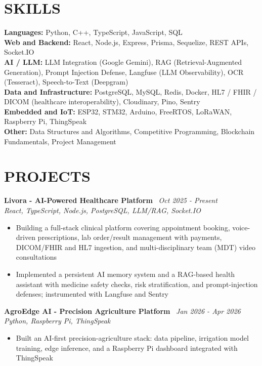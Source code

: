 \documentclass[10.5pt,a4paper]{article}
\newenvironment{tightitemize}{
  \begin{itemize}[leftmargin=15pt, itemsep=1pt, parsep=0pt, topsep=2pt]
}{
  \end{itemize}
}
\newcommand{\entrysimple}[2]{%
  \textbf{#1} \textbar\ \textit{#2}\\[1pt]
}
\begin{document}
\section*{SKILLS}
\textbf{Languages:} Python, C++, TypeScript, JavaScript, SQL\\[2pt]
\textbf{Web and Backend:} React, Node.js, Express, Prisma, Sequelize, REST APIs, Socket.IO\\[2pt]
\textbf{AI / LLM:} LLM Integration (Google Gemini), RAG (Retrieval-Augmented Generation), Prompt Injection Defense, Langfuse (LLM Observability), OCR (Tesseract), Speech-to-Text (Deepgram)\\[2pt]
\textbf{Data and Infrastructure:} PostgreSQL, MySQL, Redis, Docker, HL7 / FHIR / DICOM (healthcare interoperability), Cloudinary, Pino, Sentry\\[2pt]
\textbf{Embedded and IoT:} ESP32, STM32, Arduino, FreeRTOS, LoRaWAN, Raspberry Pi, ThingSpeak\\[2pt]
\textbf{Other:} Data Structures and Algorithms, Competitive Programming, Blockchain Fundamentals, Project Management

\section*{PROJECTS}

\entrysimple{Livora - AI-Powered Healthcare Platform}{Oct 2025 - Present}
\textit{React, TypeScript, Node.js, PostgreSQL, LLM/RAG, Socket.IO}
\begin{tightitemize}
  \item Building a full-stack clinical platform covering appointment booking, voice-driven prescriptions, lab order/result management with payments, DICOM/FHIR and HL7 ingestion, and multi-disciplinary team (MDT) video consultations
  \item Implemented a persistent AI memory system and a RAG-based health assistant with medicine safety checks, risk stratification, and prompt-injection defenses; instrumented with Langfuse and Sentry
\end{tightitemize}

\entrysimple{AgroEdge AI - Precision Agriculture Platform}{Jan 2026 - Apr 2026}
\textit{Python, Raspberry Pi, ThingSpeak}
\begin{tightitemize}
  \item Built an AI-first precision-agriculture stack: data pipeline, irrigation model training, edge inference, and a Raspberry Pi dashboard integrated with ThingSpeak
\end{tightitemize}
\end{document}
